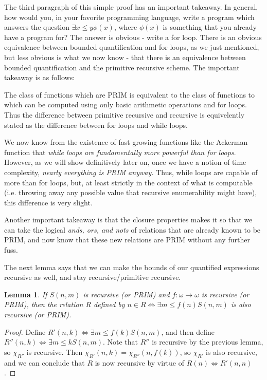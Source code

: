 \documentclass{article}
\theoremstyle{definition}
\theoremstyle{plain}
\theoremstyle{theorem}
\newtheorem{lemma}{Lemma}[section]
\begin{document}
The third paragraph of this simple proof has an important takeaway. In general, how would you, in your favorite programming language, write a program which answers the question $\exists x \leq y \phi(x)$, where $\phi(x)$ is something that you already have a program for? The answer is obvious - write a for loop. There is an obvious equivalence between bounded quantification and for loops, as we just mentioned, but less obvious is what we now know - that there is an equivalence between bounded quantification and the primitive recursive scheme. The important takeaway is as follows:
\begin{center}
    The class of functions which are PRIM is equivalent to the class of functions to which can be computed using only basic arithmetic operations and for loops. Thus the difference between primitive recursive and recursive is equivelently stated as the difference between for loops and while loops.
\end{center}
 We now know from the existence of fast growing functions like the Ackerman function that \textit{while loops are fundamentally more powerful than for loops}. However, as we will show definitively later on, once we have a notion of time complexity, \textit{nearly everything is PRIM anyway.} Thus, while loops are capable of more than for loops, but, at least strictly in the context of what is computable (i.e. throwing away any possible value that recursive enumerability might have), this difference is very slight.
 \par Another important takeaway is that the closure properties makes it so that we can take the logical \textit{ands, ors, and nots} of relations that are already known to be PRIM, and now know that these new relations are PRIM without any further fuss. 
 \par The next lemma says that we can make the bounds of our quantified expressions recursive as well, and stay recursive/primitive recursive.
\begin{lemma}
    If $S(n,m)$ is recursive (or PRIM) and $f:\omega \to \omega$ is recursive (or PRIM), then the relation $R$ defined by $n \in R \iff \exists m \leq f(n) S(n,m)$ is also recursive (or PRIM).
\end{lemma}
\begin{proof}
    Define $R'(n,k) \iff \exists m \leq f(k) S(n,m)$, and then define $R''(n,k) \iff \exists m \leq k S(n,m)$. Note that $R''$ is recursive by the previous lemma, so $\chi_{R''}$ is recursive. Then $\chi_{R'}(n,k) = \chi_{R''}(n,f(k))$, so $\chi_{R'}$ is also recursive, and we can conclude that $R$ is now recursive by virtue of $R(n) \iff R'(n,n)$.
\end{proof}
\end{document}
